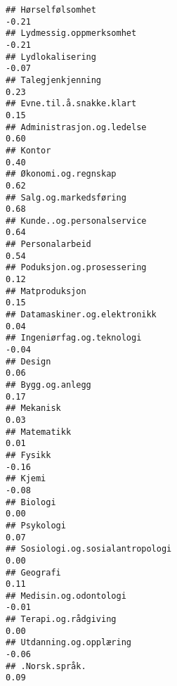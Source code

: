 \documentclass[
]{article}
\begin{document}
\begin{verbatim}
## Hørselfølsomhet                                                                  -0.21
## Lydmessig.oppmerksomhet                                                          -0.21
## Lydlokalisering                                                                  -0.07
## Talegjenkjenning                                                                  0.23
## Evne.til.å.snakke.klart                                                           0.15
## Administrasjon.og.ledelse                                                         0.60
## Kontor                                                                            0.40
## Økonomi.og.regnskap                                                               0.62
## Salg.og.markedsføring                                                             0.68
## Kunde..og.personalservice                                                         0.64
## Personalarbeid                                                                    0.54
## Poduksjon.og.prosessering                                                         0.12
## Matproduksjon                                                                     0.15
## Datamaskiner.og.elektronikk                                                       0.04
## Ingeniørfag.og.teknologi                                                         -0.04
## Design                                                                            0.06
## Bygg.og.anlegg                                                                    0.17
## Mekanisk                                                                          0.03
## Matematikk                                                                        0.01
## Fysikk                                                                           -0.16
## Kjemi                                                                            -0.08
## Biologi                                                                           0.00
## Psykologi                                                                         0.07
## Sosiologi.og.sosialantropologi                                                    0.00
## Geografi                                                                          0.11
## Medisin.og.odontologi                                                            -0.01
## Terapi.og.rådgiving                                                               0.00
## Utdanning.og.opplæring                                                           -0.06
## .Norsk.språk.                                                                     0.09

\end{verbatim}
\end{document}
